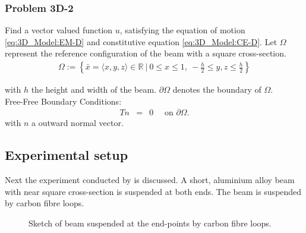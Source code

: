 \documentclass[../../main.tex]{subfiles}
\begin{document}
\subsubsection{Problem 3D-2}
Find a vector valued function $u$, satisfying the equation of motion \eqref{eq:3D_Model:EM-D} and constitutive equation \eqref{eq:3D_Model:CE-D}. Let $\Omega$ represent the reference configuration of the beam with a square cross-section.
\begin{eqnarray*}
	\Omega := \left\{ \bar{x} = \langle x,y,z \rangle \in \mathbb{R} \ | \ 0 \leq x \leq 1, \ -\frac{h}{2} \leq y, z \leq \frac{h}{2}  \right\}
\end{eqnarray*}

with $h$ the height and width of the beam. $\partial \Omega$ denotes the boundary of $\Omega$. \\

{Free-Free Boundary Conditions:}\\
\begin{eqnarray*}
	Tn & = & 0 \quad \textrm{ on } \partial\Omega.
\end{eqnarray*} with $n$ a outward normal vector.


\subsection{Experimental setup}
Next the experiment conducted by \cite{SP06} is discussed. A short, aluminium alloy beam with near square cross-section is suspended at both ends. The beam is suspended by carbon fibre loops.

\begin{figure}[h!]
	\centering
	\caption{Sketch of beam suspended at the end-points by carbon fibre loops.}
\end{figure} 
\FloatBarrier
\end{document}

